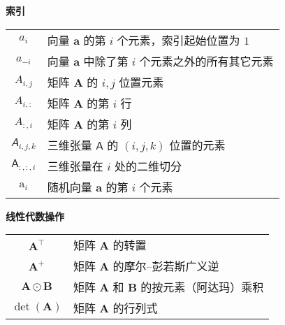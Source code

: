 \vspace{1em}

\begin{center}
  {\Large\bfseries 索引}\\
  \vspace{1em}
  \begin{tabular}{c l}
    $a_i$ & 向量 $\pmb{a}$ 的第 $i$ 个元素，索引起始位置为 $1$ \\
    $a_{-i}$ & 向量 $\pmb{a}$ 中除了第 $i$ 个元素之外的所有其它元素 \\
    $A_{i,j}$ & 矩阵 $\pmb{A}$ 的 $i,j$ 位置元素 \\
    $A_{i,:}$ & 矩阵 $\pmb{A}$ 的第 $i$ 行 \\
    $A_{:,i}$ & 矩阵 $\pmb{A}$ 的第 $i$ 列 \\
    $\mathsfit{A}_{i,j,k}$ & 三维张量 $\pmb{\mathsf{A}}$ 的 $(i,j,k)$ 位置的元素 \\
    $\pmb{\mathsf{A}}_{:,:,i}$ & 三维张量在 $i$ 处的二维切分 \\
    $\mathrm{a}_i$ & 随机向量 $\mathbf{a}$ 的第 $i$ 个元素
  \end{tabular}
\end{center}

\vspace{1em}

\begin{center}
  {\Large\bfseries 线性代数操作}\\
  \vspace{1em}
  \begin{tabular}{c l}
    $\pmb{A}^{\top}$ & 矩阵 $\pmb{A}$ 的转置 \\
    $\pmb{A}^+$ & 矩阵 $\pmb{A}$ 的摩尔--彭若斯广义逆 \\
    $\pmb{A} \odot \pmb{B}$ & 矩阵 $\pmb{A}$ 和 $\pmb{B}$ 的按元素（阿达玛）乘积 \\
    $\det(\pmb{A})$ & 矩阵 $\pmb{A}$ 的行列式
  \end{tabular}
\end{center}

\vspace{1em}

